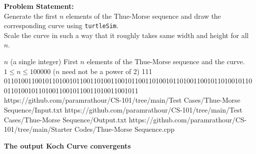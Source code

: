\documentclass[../../Problems]{subfiles}
\begin{document}
\textbf{Problem Statement:}\\
Generate the first $n$ elements of the Thue-Morse sequence and draw the corresponding curve using \verb!turtleSim!.\\
Scale the curve in such a way that it roughly takes same width and height for all $n$.
\begin{testcasesMore}
	{$n$ \hfill(a single integer)}
	{First $n$ elements of the Thue-Morse sequence and the curve.}
	{$1 \leq n \leq 100000$ ($n$ need not be a power of 2)}
	{111}
	{011010011001011010010110011010011001011001101001011010011001011010010110011010010110100110010110011010011001011}
	{https://github.com/paramrathour/CS-101/tree/main/Test Cases/Thue-Morse Sequence/Input.txt}
	{https://github.com/paramrathour/CS-101/tree/main/Test Cases/Thue-Morse Sequence/Output.txt}
	{https://github.com/paramrathour/CS-101/tree/main/Starter Codes/Thue-Morse Sequence.cpp}
\end{testcasesMore}
\textbf{The output Koch Curve convergents}
\end{document}
